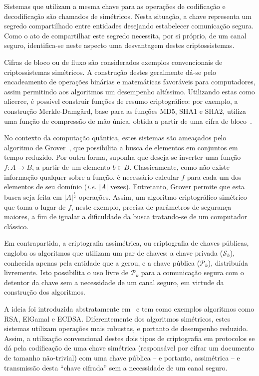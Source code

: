 \documentclass[12pt,notitlepage]{report}
\newcommand{\pk}{\mathcal{P}_k}
\newcommand{\sk}{\mathcal{S}_k}
\newcommand{\length}[1]{\vert #1 \vert}
\begin{document}
Sistemas que utilizam a mesma chave para as operações de codificação
e decodificação são chamados de simétricos. Nesta situação, a chave
representa um segredo compartilhado entre entidades desejando
estabelecer comunicação segura. Como o ato de compartilhar
este segredo necessita, por si próprio, de um canal seguro,
identifica-se neste aspecto uma desvantagem destes criptossistemas.

Cifras de bloco ou de fluxo são
considerados exemplos convencionais de criptossistemas simétricos.
A construção destes geralmente dá-se pelo encadeamento de operações
binárias e matemáticas favoráveis para computadores, assim permitindo
aos algoritmos um desempenho altíssimo. Utilizando estas como alicerce,
é possível construir funções de resumo criptográfico: por exemplo,
a construção Merkle-Damgård, base para as funções
MD5, SHA1 e SHA2, utiliza uma função de compressão de mão única, obtida
a partir de uma cifra de bloco~\cite[9.41]{Menezes:1996:HAC:548089}.

No contexto da computação quântica, estes sistemas são ameaçados
pelo algoritmo de Grover~\cite{Grover:1996:FQM:237814.237866}, que
possibilita a busca de elementos em conjuntos em tempo reduzido.
Por outra forma, suponha que deseja-se inverter uma função $f : A
\longrightarrow B$, a partir de um elemento $b \in B$. Classicamente,
como não existe informação qualquer sobre a função, é necessário
calcular $f$ para cada um dos elementos de seu domínio (\emph{i.e.} $\length{A}$
vezes). Entretanto, Grover permite que esta busca seja feita em
$\length{A}^{\frac{1}{2}}$ operações. Assim, um algoritmo criptográfico simétrico
que toma o lugar de $f$, neste exemplo, precisa de parâmetros de segurança
maiores, a fim de igualar a dificuldade da busca tratando-se de um
computador clássico.

Em contrapartida, a criptografia assimétrica, ou criptografia de chaves
públicas, engloba os algoritmos que utilizam um par de chaves: a chave privada
($\sk{}$), conhecida apenas pela entidade que a gerou, e a chave pública
($\pk{}$), distribuída livremente. Isto possibilita o uso livre de $\pk{}$ para
a comunicação segura com o detentor da chave sem a necessidade de um canal
seguro, em virtude da construção dos algoritmos.

A ideia foi introduzida abstratamente em~\cite{Diffie:2006:NDC:2263321.2269104}
e tem como exemplos algoritmos como RSA, ElGamal e ECDSA.
Diferentemente dos algoritmos simétricos, estes sistemas utilizam operações
mais robustas, e portanto de desempenho reduzido. Assim, a utilização
convencional destes dois tipos de criptografia em protocolos se dá pela
codificação de uma chave simétrica (responsável por cifrar um documento
de tamanho não-trivial) com uma chave pública -- e portanto,
assimétrica -- e transmissão desta ``chave cifrada'' sem a necessidade de
um canal seguro.
\end{document}
